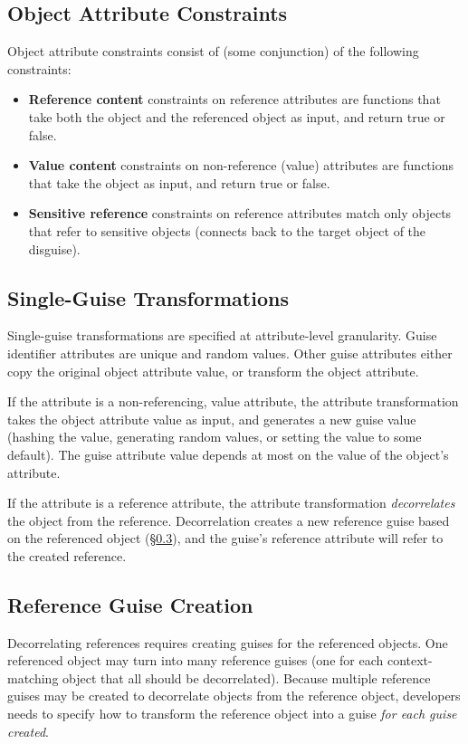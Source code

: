 \subsection{Object Attribute Constraints}
\label{sec:constraints} 

Object attribute constraints consist of (some conjunction) of the following constraints:
\begin{itemize}[nosep]
\item \textbf{Reference content} constraints on reference attributes are functions that
    take both the object and the referenced object as input, and return true or false. 
\item \textbf{Value content} constraints on non-reference (value) attributes are functions that take the object as
input, and return true or false.  
\item \textbf{Sensitive reference} constraints on reference attributes match only objects that refer
    to sensitive objects (\ie connects back to the target object of the disguise).
\end{itemize}

\subsection{Single-Guise Transformations}
\label{sec:single_guise} 
Single-guise transformations are specified at attribute-level granularity. 
Guise identifier attributes are unique and random values. 
%
Other guise attributes either copy the original object attribute value, 
or transform the object attribute.  

If the attribute is a non-referencing, value attribute, the attribute transformation takes the
object attribute value as input, and generates a new guise value (\eg hashing the value, generating
random values, or setting the value to some default).  The guise attribute value depends at most on
the value of the object's attribute.

If the attribute is a reference attribute, the attribute transformation \emph{decorrelates} the 
object from the reference. Decorrelation creates a new reference guise based on the referenced
object (\S\ref{sec:reference_guises}), and the guise's reference attribute will refer to the
created reference.

\subsection{Reference Guise Creation}
\label{sec:reference_guises} 
%
Decorrelating references requires creating guises for the referenced objects. One referenced object may turn into many
reference guises (one for each context-matching object that all should be decorrelated).  Because
multiple reference guises may be created to decorrelate objects from the reference object,
developers needs to specify how to transform the reference object into a guise \emph{for each guise
created}.

